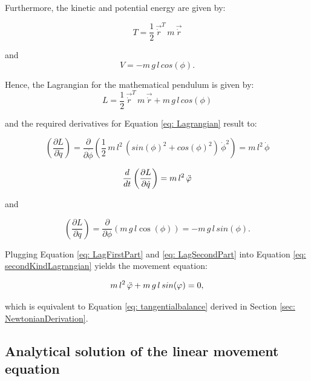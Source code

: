 \documentclass[12pt,bibstyle=none,pagenumberinfooter]{ifmdocument}
\begin{document}
Furthermore, the kinetic and potential energy are given by:

\begin{equation}
    T = \frac{1}{2}\,\Vec{\Dot{r}}^T\,m\,\Vec{\Dot{r}}
\end{equation}

and
\begin{equation}
    V = -m\,g\,l\,cos(\phi).
\end{equation}

Hence, the Lagrangian for the mathematical pendulum is given by:
\begin{equation}
    L = \frac{1}{2}\,\Vec{\Dot{r}}^T\,m\,\Vec{\Dot{r}} + m\,g\,l\,cos(\phi)
\end{equation}

and the required derivatives for Equation \ref{eq: Lagrangian} result to:

\begin{equation}
    \left(\frac{\partial L}{\partial \Dot{q}}\right) = \frac{\partial}{\partial \Dot{\phi}} \left( \frac{1}{2}\,m\,l^2\,(sin(\phi)^2 + cos(\phi)^2)\,\Dot{\phi}^2 \right) = m\,l^2\,\Dot{\phi}
\end{equation}

\begin{equation}
    \label{eq: LagFirstPart}
    \frac{d}{dt}\left(\frac{\partial L}{\partial \Dot{q}}\right) = m\,l^2\,\Ddot{\phi}
\end{equation}

and

\begin{equation}
    \label{eq: LagSecondPart}
    \left(\frac{\partial L}{\partial q}  \right) = \frac{\partial}{\partial \phi} \left(m\,g\,l\cos(\phi)\right) = -m\,g\,l\,sin(\phi).
\end{equation}

Plugging Equation \ref{eq: LagFirstPart} and \ref{eq: LagSecondPart} into Equation \ref{eq: secondKindLagrangian} yields the movement equation:

\begin{equation}
    m\,l^2\,\Ddot{\phi} + m\,g\,l\,sin(\phi) = 0,
\end{equation}

which is equivalent to Equation \ref{eq: tangentialbalance} derived in Section \ref{sec: NewtonianDerivation}.


\subsection{Analytical solution of the linear movement equation}
\end{document}

